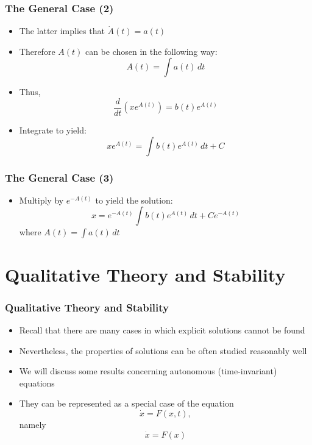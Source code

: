 \documentclass[10pt,usenames,dvipsnames]{beamer}
\theoremstyle{definition}
\begin{document}
\begin{frame}[fragile]
\frametitle{The General Case (2)}
\begin{itemize}
	\item The latter implies that $\dot{A}(t) = a(t)$
	\item Therefore $A(t)$ can be chosen in the following way:
	\[
		A(t) = \int a(t)\, dt
	\]
	\item Thus,
	\[
		\dfrac{d}{dt}(xe^{A(t)}) = b(t)e^{A(t)}
	\]
	\item Integrate to yield:
	\[
		xe^{A(t)} = \int b(t)e^{A(t)}\,dt + C
	\]
\end{itemize}
\end{frame}

\begin{frame}[fragile]
\frametitle{The General Case (3)}
\begin{itemize}
	\item Multiply by $e^{-A(t)}$ to yield the solution:
	\[
		x = e^{-A(t)}\int b(t)e^{A(t)}\,dt + Ce^{-A(t)}
	\]
	where $A(t) = \displaystyle\int a(t)\, dt$
\end{itemize}
\end{frame}

\section{Qualitative Theory and Stability}
\begin{frame}[fragile]
\frametitle{Qualitative Theory and Stability}
\begin{itemize}
	\item Recall that there are many cases in which explicit solutions cannot be found
	\item Nevertheless, the properties of solutions can be often studied reasonably well
	\item We will discuss some results concerning autonomous (time-invariant) equations
	\item They can be represented as a special case of the equation
	\[
		\dot{x} = F(x,t),
	\]
	\noindent namely
	\[
		\dot{x} = F(x)
	\]
	
\end{itemize}
\end{frame}
\end{document}
